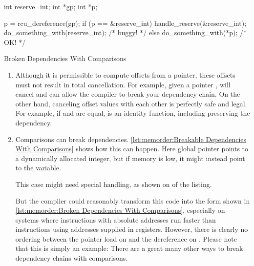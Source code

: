 \begin{listing}
\begin{fcvlabel}
\begin{VerbatimL}[commandchars=\\\[\]]
int reserve_int;
int *gp;
int *p;

p = rcu_dereference(gp);	\lnlbl[deref1]
if (p == &reserve_int) {
	handle_reserve(&reserve_int);
	do_something_with(reserve_int); /* buggy! */ \lnlbl[deref2]
} else {
	do_something_with(*p); /* OK! */
}
\end{VerbatimL}
\end{fcvlabel}
\caption{Broken Dependencies With Comparisons}
\label{lst:memorder:Broken Dependencies With Comparisons}
\end{listing}

\begin{enumerate}
\item	Although it is permissible to compute offsets from a
	pointer, these offsets must not result in total cancellation.
	For example, given a  pointer ,
	 will cancel and can allow the compiler
	to break your dependency chain.
	On the other hand, canceling offset values with each other
	is perfectly safe and legal.
	For example, if  and  are equal, 
	is an identity function, including preserving the dependency.
\item	Comparisons can break dependencies.
	\cref{lst:memorder:Breakable Dependencies With Comparisons}
	shows how this can happen.
	Here global pointer  points to a dynamically allocated
	integer, but if memory is low, it might instead point to
	the  variable.
	\begin{fcvref}
	This  case might need special handling, as
	shown on  of the listing.
	\end{fcvref}
        \begin{fcvref}
	But the compiler could reasonably transform this code into
	the form shown in
	\cref{lst:memorder:Broken Dependencies With Comparisons},
	especially on systems where instructions with absolute
	addresses run faster than instructions using addresses
	supplied in registers.
	However, there is clearly no ordering between the pointer
	load on  and the dereference on .
	Please note that this is simply an example: There are a great
	many other ways to break dependency chains with comparisons.
	\end{fcvref}
\end{enumerate}

